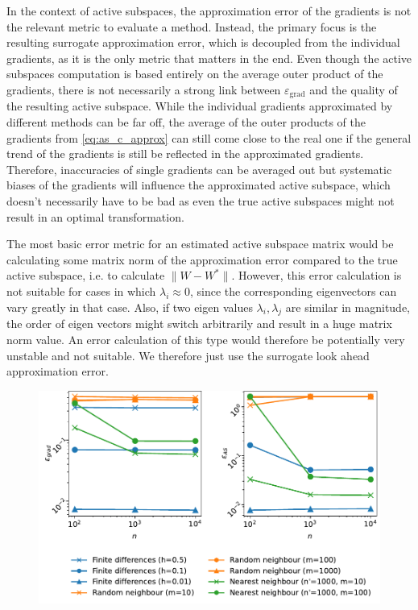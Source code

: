 \documentclass[
  a4paper,  %
  twoside,  %
  bibliography=totoc,
  headsepline,
  cleardoublepage=empty,
  parskip=half,
  draft=false
]{scrbook}
\begin{document}
In the context of active subspaces, the approximation error of the gradients is not the relevant metric to evaluate a method.
Instead, the primary focus is the resulting surrogate approximation error, which is decoupled from the individual gradients, as it is the only metric that matters in the end.
Even though the active subspaces computation is based entirely on the average outer product of the gradients, there is not necessarily a strong link between $\varepsilon_{\text{grad}}$ and the quality of the resulting active subspace.
While the individual gradients approximated by different methods can be far off, the average of the outer products of the gradients from \cref{eq:as_c_approx} can still come close to the real one if the general trend of the gradients is still be reflected in the approximated gradients.
Therefore, inaccuracies of single gradients can be averaged out but systematic biases of the gradients will influence the approximated active subspace, which doesn't necessarily have to be bad as even the true active subspaces might not result in an optimal transformation.

The most basic error metric for an estimated active subspace matrix would be calculating some matrix norm of the approximation error compared to the true active subspace, i.e. to calculate $\| W - W^\ast \|$.
However, this error calculation is not suitable for cases in which $\lambda_i \approx 0$, since the corresponding eigenvectors can vary greatly in that case.
Also, if two eigen values $\lambda_i, \lambda_j$ are similar in magnitude, the order of eigen vectors might switch arbitrarily and result in a huge matrix norm value.
An error calculation of this type would therefore be potentially very unstable and not suitable.
We therefore just use the surrogate look ahead approximation error.

\begin{mdframed}[style=style]
\begin{figure}[H]
\centering
	\includegraphics[width=\textwidth]{graphics/as_errors_f1}
\delimit
	\label{fig:as_errors_f1}
\end{figure}
\end{mdframed}
\end{document}
